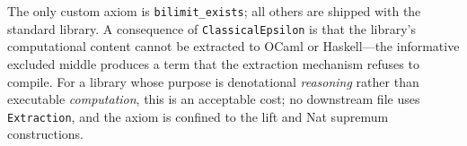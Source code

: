 
The only custom axiom is \texttt{bilimit\_exists}; all others are
shipped with the \Rocq{} standard library.
A consequence of \texttt{ClassicalEpsilon} is that the library's
computational content cannot be extracted to OCaml or Haskell---the
informative excluded middle produces a term that the extraction
mechanism refuses to compile.
For a library whose purpose is denotational \emph{reasoning} rather
than executable \emph{computation}, this is an acceptable cost; no
downstream file uses \texttt{Extraction}, and the axiom is confined
to the lift and Nat supremum constructions.

